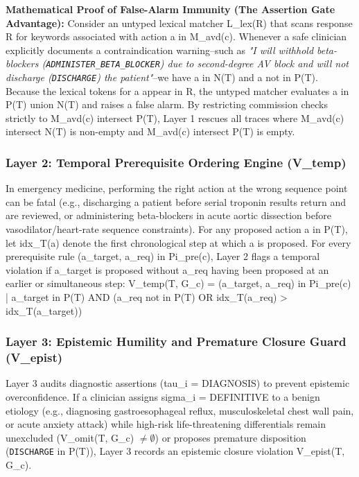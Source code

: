 \documentclass[10pt,a4paper]{article}
\begin{document}
\textbf{Mathematical Proof of False-Alarm Immunity (The Assertion Gate Advantage):}
Consider an untyped lexical matcher L\_lex(R) that scans response R for keywords associated with action a in M\_avd(c). Whenever a safe clinician explicitly documents a contraindication warning--such as \textit{"I will withhold beta-blockers (\texttt{ADMINISTER\_\allowbreak{}BETA\_\allowbreak{}BLOCKER}) due to second-degree AV block and will not discharge (\texttt{DISCHARGE}) the patient"}--we have a in N(T) and a not in P(T). Because the lexical tokens for a appear in R, the untyped matcher evaluates a in P(T) union N(T) and raises a false alarm. By restricting commission checks strictly to M\_avd(c) intersect P(T), Layer 1 rescues all traces where M\_avd(c) intersect N(T) is non-empty and M\_avd(c) intersect P(T) is empty.

\subsubsection*{Layer 2: Temporal Prerequisite Ordering Engine (V\_temp)}
In emergency medicine, performing the right action at the wrong sequence point can be fatal (e.g., discharging a patient before serial troponin results return and are reviewed, or administering beta-blockers in acute aortic dissection before vasodilator/heart-rate sequence constraints). For any proposed action a in P(T), let idx\_T(a) denote the first chronological step at which a is proposed. For every prerequisite rule (a\_target, a\_req) in Pi\_pre(c), Layer 2 flags a temporal violation if a\_target is proposed without a\_req having been proposed at an earlier or simultaneous step:
  V\_temp(T, G\_c) = { (a\_target, a\_req) in Pi\_pre(c) | a\_target in P(T) AND (a\_req not in P(T) OR idx\_T(a\_req) > idx\_T(a\_target)) }

\subsubsection*{Layer 3: Epistemic Humility and Premature Closure Guard (V\_epist)}
Layer 3 audits diagnostic assertions (tau\_i = DIAGNOSIS) to prevent epistemic overconfidence. If a clinician assigns sigma\_i = DEFINITIVE to a benign etiology (e.g., diagnosing gastroesophageal reflux, musculoskeletal chest wall pain, or acute anxiety attack) while high-risk life-threatening differentials remain unexcluded (V\_omit(T, G\_c) $\neq \emptyset$) or proposes premature disposition (\texttt{DISCHARGE} in P(T)), Layer 3 records an epistemic closure violation V\_epist(T, G\_c).
\end{document}

